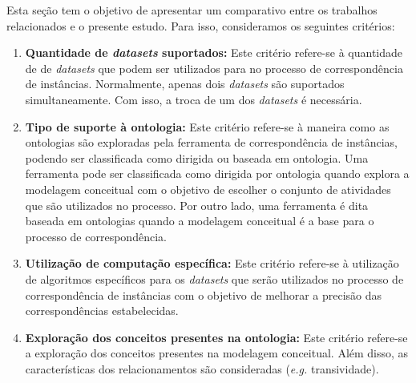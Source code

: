 Esta seção tem o objetivo de apresentar um comparativo entre os trabalhos relacionados e o presente estudo. Para isso, consideramos os seguintes critérios: 
\begin{enumerate}
\item \textbf{Quantidade de \textit{datasets} suportados:} Este critério refere-se à quantidade de de \textit{datasets} que podem ser utilizados para no processo de correspondência de instâncias. Normalmente, apenas dois \textit{datasets} são suportados simultaneamente. Com isso, a troca de um dos \textit{datasets} é necessária.
\item \textbf{Tipo de suporte à ontologia:} Este critério refere-se à maneira como as ontologias são exploradas pela ferramenta de correspondência de instâncias, podendo ser classificada como dirigida ou baseada em ontologia.  Uma ferramenta pode ser classificada como dirigida por ontologia quando explora a modelagem conceitual com o objetivo de escolher o conjunto de atividades que são utilizados no processo. Por outro lado, uma ferramenta é dita baseada em ontologias quando a modelagem conceitual é a base para o processo de correspondência.
\item \textbf{Utilização de computação específica:} Este critério refere-se à utilização de algoritmos específicos para os \textit{datasets} que serão utilizados no processo de correspondência de instâncias com o objetivo de melhorar a precisão das correspondências estabelecidas.
\item \textbf{Exploração dos conceitos presentes na ontologia:} Este critério refere-se a exploração dos conceitos presentes na modelagem conceitual. Além disso, as características dos relacionamentos são consideradas (\textit{e.g.} transividade).
\end{enumerate}

